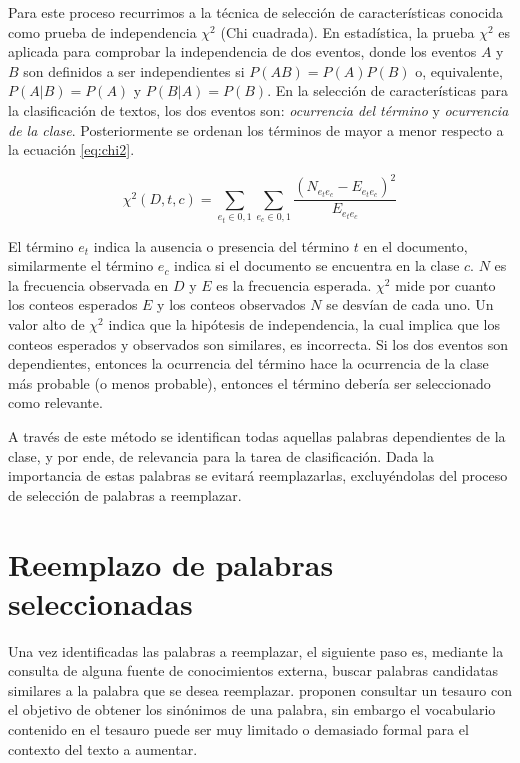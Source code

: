 Para este proceso recurrimos a la técnica de selección de características conocida como prueba de independencia $\chi^2$ (Chi cuadrada). En estadística, la prueba $\chi^2$ es aplicada para comprobar la independencia de dos eventos, donde los eventos $A$ y $B$ son definidos a ser independientes si  $P(AB)= P(A)P(B)$ o, equivalente, $P(A|B)=P(A)$ y $P(B|A)=P(B)$. En la selección de características para la clasificación de textos, los dos eventos son: \textit{ocurrencia del término} y \textit{ocurrencia de la clase}. Posteriormente se ordenan los términos de mayor a menor respecto a la ecuación \ref{eq:chi2}.

\begin{equation}
    \label{eq:chi2}
    \chi^2(D, t, c)= \sum_{e_t \in {0,1} }^{} \sum_{e_c \in {0,1} }^{} \frac{(N_{e_t e_c} - E _{e_t e_c})^2}{E_{e_t e_c}}
\end{equation}

El término $e_t$ indica la ausencia o presencia del término $t$ en el documento, similarmente el término $e_c$ indica si el documento se encuentra en la clase $c$. $N$ es la frecuencia observada en $D$ y $E$ es la frecuencia esperada. $\chi^2$ mide por cuanto los conteos esperados $E$ y los conteos observados $N$ se desvían de cada uno. Un valor alto de $\chi^2$ indica que la hipótesis de independencia, la cual implica que los conteos esperados y observados son similares, es incorrecta. Si los dos eventos son dependientes, entonces la ocurrencia del término hace la ocurrencia de la clase más probable (o menos probable), entonces el término debería ser seleccionado como relevante.

A través de este método se identifican todas aquellas palabras dependientes de la clase, y por ende, de relevancia para la tarea de clasificación. Dada la importancia de estas palabras se evitará reemplazarlas, excluyéndolas del proceso de selección de palabras a reemplazar.

\section{Reemplazo de palabras seleccionadas}

Una vez identificadas las palabras a reemplazar, el siguiente paso es, mediante la consulta de alguna fuente de conocimientos externa, buscar palabras candidatas similares a la palabra que se desea reemplazar. \citep{zhang2015character} proponen consultar un tesauro con el objetivo de obtener los sinónimos de una palabra, sin embargo el vocabulario contenido en el tesauro puede ser muy limitado o demasiado formal para el contexto del texto a aumentar. 

